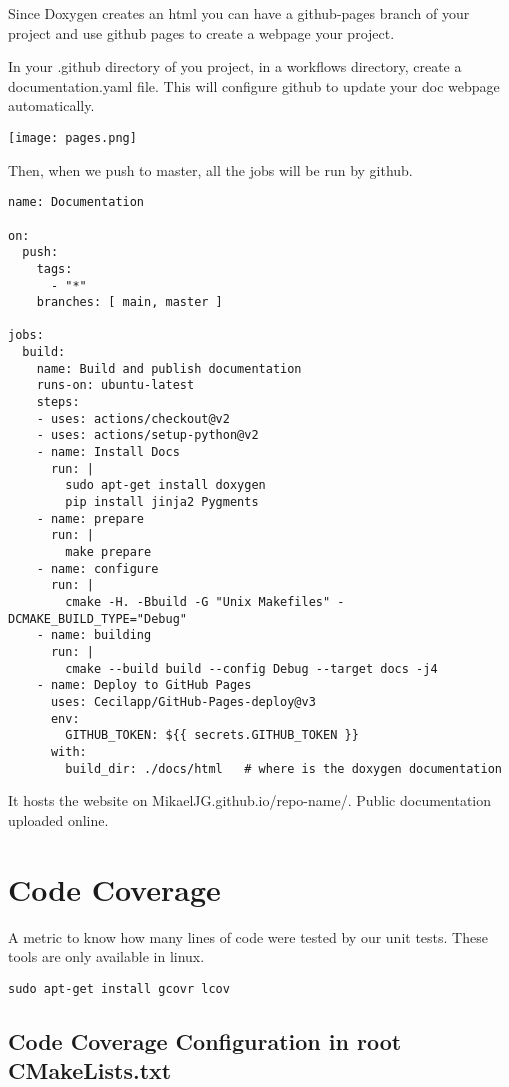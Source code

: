 \documentclass[openany]{report}
\begin{document}
Since Doxygen creates an html you can have a github-pages branch of your project and
use github pages to create a webpage your project.

In your .github directory of you project, in a workflows directory, create a documentation.yaml file. 
This will configure github to update your doc webpage automatically.


\begin{center}
    \texttt{[image: pages.png]}
\end{center}

Then, when we push to master, all the jobs will be run by github.

\begin{verbatim}
name: Documentation

on:
  push:
    tags:
      - "*"
    branches: [ main, master ]

jobs:
  build:
    name: Build and publish documentation
    runs-on: ubuntu-latest
    steps:
    - uses: actions/checkout@v2
    - uses: actions/setup-python@v2
    - name: Install Docs
      run: |
        sudo apt-get install doxygen
        pip install jinja2 Pygments
    - name: prepare
      run: |
        make prepare
    - name: configure
      run: |
        cmake -H. -Bbuild -G "Unix Makefiles" -DCMAKE_BUILD_TYPE="Debug"
    - name: building
      run: |
        cmake --build build --config Debug --target docs -j4
    - name: Deploy to GitHub Pages
      uses: Cecilapp/GitHub-Pages-deploy@v3
      env:
        GITHUB_TOKEN: ${{ secrets.GITHUB_TOKEN }}
      with:
        build_dir: ./docs/html   # where is the doxygen documentation
\end{verbatim}

It hosts the website on MikaelJG.github.io/repo-name/. Public documentation uploaded online.

\section{Code Coverage}

A metric to know how many lines of code were tested by our unit tests.
These tools are only available in linux.

\begin{verbatim}
sudo apt-get install gcovr lcov
\end{verbatim}

\subsection{Code Coverage Configuration in root CMakeLists.txt}
\end{document}
